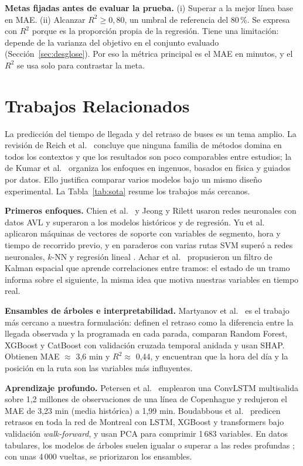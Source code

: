 \documentclass[conference,spanish]{IEEEtran}
\begin{document}
\textbf{Metas fijadas antes de evaluar la prueba.} (i) Superar a la mejor línea base en MAE. (ii) Alcanzar $R^2\ge0{,}80$, un umbral de referencia del 80\,\%. Se expresa con $R^2$ porque es la proporción propia de la regresión. Tiene una limitación: depende de la varianza del objetivo en el conjunto evaluado (Sección~\ref{sec:desglose}). Por eso la métrica principal es el MAE en minutos, y el $R^2$ se usa solo para contrastar la meta.

\section{Trabajos Relacionados}

La predicción del tiempo de llegada y del retraso de buses es un tema amplio. La revisión de Reich et al.\ \cite{reich2019} concluye que ninguna familia de métodos domina en todos los contextos y que los resultados son poco comparables entre estudios; la de Kumar et al.\ \cite{kumar2025review} organiza los enfoques en ingenuos, basados en física y guiados por datos. Ello justifica comparar varios modelos bajo un mismo diseño experimental. La Tabla~\ref{tab:sota} resume los trabajos más cercanos.

\textbf{Primeros enfoques.} Chien et al.\ \cite{chien2002} y Jeong y Rilett \cite{jeong2004} usaron redes neuronales con datos AVL y superaron a los modelos históricos y de regresión. Yu et al.\ \cite{yu2006} aplicaron máquinas de vectores de soporte con variables de segmento, hora y tiempo de recorrido previo, y en paraderos con varias rutas SVM superó a redes neuronales, $k$-NN y regresión lineal \cite{yu2011}. Achar et al.\ \cite{achar2020} propusieron un filtro de Kalman espacial que aprende correlaciones entre tramos: el estado de un tramo informa sobre el siguiente, la misma idea que motiva nuestras variables en tiempo real.

\textbf{Ensambles de árboles e interpretabilidad.} Martyanov et al.\ \cite{martyanov2026} es el trabajo más cercano a nuestra formulación: definen el retraso como la diferencia entre la llegada observada y la programada en cada parada, comparan Random Forest, XGBoost y CatBoost con validación cruzada temporal anidada y usan SHAP. Obtienen MAE $\approx$ 3,6 min y $R^2\approx$ 0,44, y encuentran que la hora del día y la posición en la ruta son las variables más influyentes.

\textbf{Aprendizaje profundo.} Petersen et al.\ \cite{petersen2019} emplearon una ConvLSTM multisalida sobre 1,2 millones de observaciones de una línea de Copenhague y redujeron el MAE de 3,23 min (media histórica) a 1,99 min. Boudabbous et al.\ \cite{boudabbous2026} predicen retrasos en toda la red de Montreal con LSTM, XGBoost y transformers bajo validación \textit{walk-forward}, y usan PCA para comprimir 1\,683 variables. En datos tabulares, los modelos de árboles suelen igualar o superar a las redes profundas \cite{grinsztajn2022}; con unas 4\,000 vueltas, se priorizaron los ensambles.
\end{document}
